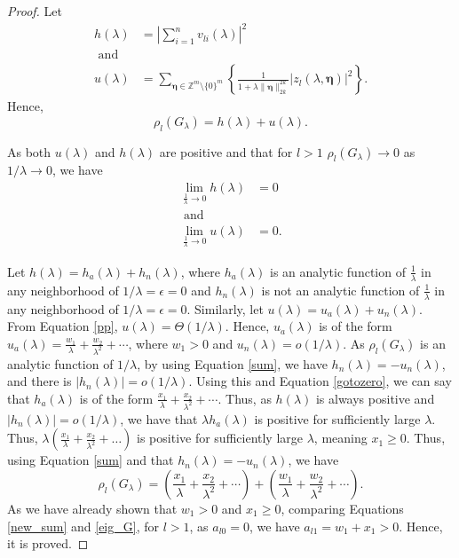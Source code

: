 \documentclass[multixcb]{amstext-l}
\theoremstyle{plain}
\theoremstyle{definition}
\theoremstyle{definition}
\theoremstyle{remark}
\numberwithin{equation}{chapter}
\begin{document}
\begin{proof}
Let \begin{equation}
    \begin{aligned}
        h(\lambda) &= \left|\sum\limits_{i=1}^nv_{li}(\lambda)\right|^2\\\mbox{  and }\\
        u(\lambda) &= \sum_{\boldsymbol{\eta}\in\mathbb{Z}^m\setminus\{0\}^m}\left\{ \frac{1}{1+\lambda\|\boldsymbol{\eta}\|_{2k}^{2k}}\left|z_l(\lambda,\boldsymbol{\eta})\right|^2 \right\}.
        \end{aligned}
\end{equation}
Hence, \begin{equation}\label{sum}
   \rho_l(G_{\lambda}) = h(\lambda) + u(\lambda).
\end{equation}

As both $u(\lambda)$ and $h(\lambda)$ are positive and that for $l>1$ $\rho_l(G_{\lambda}) \to 0$ as $1/\lambda\to 0$, we have \begin{equation}\label{gotozero}
    \begin{aligned}
        \lim\limits_{\frac{1}{\lambda}\to0}h(\lambda) &= 0\\  \mbox{  and  }\\
        \lim\limits_{\frac{1}{\lambda}\to0}u(\lambda) &= 0.
    \end{aligned}
\end{equation}

Let $h(\lambda) = h_a(\lambda) + h_n(\lambda)$, where $h_a(\lambda)$ is an analytic function of $\frac{1}{\lambda}$ in any neighborhood of $1/\lambda =\epsilon = 0$ and $h_n(\lambda)$ is not an analytic function of $\frac{1}{\lambda}$ in any neighborhood of $1/\lambda =\epsilon = 0$. Similarly, let $u(\lambda) = u_a(\lambda) + u_n(\lambda)$. From Equation \ref{pp}, $u(\lambda) = \Theta(1/\lambda)$. Hence, $u_a(\lambda)$ is of the form $u_a(\lambda) = \frac{w_1}{\lambda}+\frac{w_2}{\lambda^2}+\cdots$, where $w_1>0$ and $u_n(\lambda) = o(1/\lambda)$. As $\rho_l(G_{\lambda})$ is an analytic function of $1/\lambda$, by using Equation \ref{sum}, we have $h_n(\lambda) = - u_n(\lambda)$, and there is $\left|h_n(\lambda)\right| = o(1/\lambda)$. Using this and Equation \ref{gotozero}, we can say that $h_a(\lambda)$ is of the form $\frac{x_1}{\lambda}+\frac{x_2}{\lambda^2}+\cdots$. Thus, as $h(\lambda)$ is always positive and $|h_n(\lambda)| = o(1/\lambda)$, we have that $\lambda h_a(\lambda)$ is positive for sufficiently large $\lambda$. Thus, $\lambda(\frac{x_1}{\lambda}+\frac{x_2}{\lambda^2}+\ldots)$ is positive for sufficiently large $\lambda$, meaning $x_1\ge 0$. Thus, using Equation \ref{sum} and that $h_n(\lambda) = -u_n(\lambda)$, we have \begin{equation}\label{new_sum}
    \rho_l(G_{\lambda}) = \left(\frac{x_1}{\lambda}+\frac{x_2}{\lambda^2}+\cdots\right) + \left(\frac{w_1}{\lambda}+\frac{w_2}{\lambda^2}+\cdots\right).
\end{equation} As we have already shown that $w_1>0$ and $x_1\ge 0$, comparing Equations \ref{new_sum} and \ref{eig_G}, for $l>1$, as $a_{l0} = 0$, we have $a_{l1} = w_1+x_1 > 0$. Hence, it is proved.



\end{proof}
\end{document}
